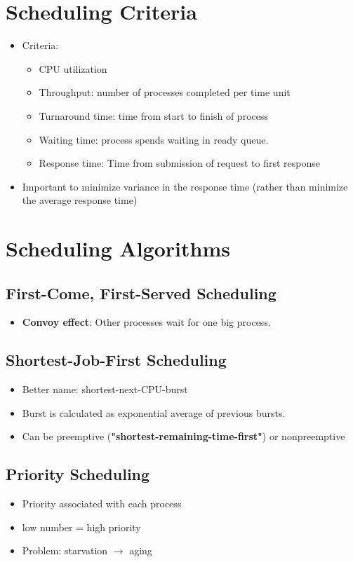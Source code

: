 \documentclass[10pt]{report}
\begin{document}
	\section{Scheduling Criteria}
		\begin{itemize}
			\item Criteria:
			\begin{itemize}
				\item CPU utilization
				\item Throughput: number of processes completed per time unit
				\item Turnaround time: time from start to finish of process
				\item Waiting time: process spends waiting in ready queue.
				\item Response time: Time from submission of request to first response
			\end{itemize}
			\item Important to minimize variance in the response time (rather than minimize the average response time)
		\end{itemize}

	\section{Scheduling Algorithms}
		\subsection{First-Come, First-Served Scheduling}
			\begin{itemize}
				\item \textbf{Convoy effect}: Other processes wait for one big process.
			\end{itemize}

		\subsection{Shortest-Job-First Scheduling}
			\begin{itemize}
				\item Better name: shortest-next-CPU-burst
				\item Burst is calculated as exponential average of previous bursts.
				\item Can be preemptive (\textbf{"shortest-remaining-time-first"}) or nonpreemptive
			\end{itemize}

		\subsection{Priority Scheduling}
			\begin{itemize}
				\item Priority associated with each process
				\item low number = high priority
				\item Problem: starvation $\rightarrow$ aging
			\end{itemize}
\end{document}
